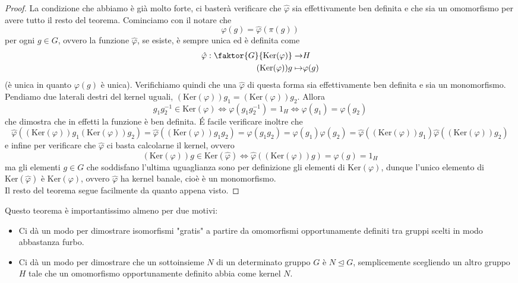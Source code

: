 \documentclass[11pt]{scrartcl}
\renewcommand{\ker}[1]{\text{Ker}\!\left(#1\right)}
\newcommand{\normal}{\mathrel{\unlhd}}
\begin{document}
	\begin{proof}
		La condizione che abbiamo è già molto forte, ci basterà verificare che $\hat{\varphi}$ sia effettivamente ben definita e che sia un omomorfismo per avere tutto il resto del teorema. Cominciamo con il notare che 
		$$\varphi(g)=\hat{\varphi}(\pi(g))$$
		per ogni $g\in G$, ovvero la funzione $\hat{\varphi}$, se esiste, è sempre unica ed è definita come
		\begin{align*}
			\hat{\varphi}:\faktor{G}{\ker{\varphi}}\to & H \\
			(\ker{\varphi})g \mapsto & \varphi(g)
		\end{align*}
		(è unica in quanto $\varphi(g)$ è unica). Verifichiamo quindi che una $\hat{\varphi}$ di questa forma sia effettivamente ben definita e sia un monomorfismo. \\
		Pendiamo due laterali destri del kernel uguali, $(\ker {\varphi})g_1=(\ker{\varphi})g_2$. Allora 
		$$g_1g_2^{-1}\in\ker{\varphi} \iff \varphi(g_1g_2^{-1})=1_H \iff \varphi(g_1)=\varphi(g_2)$$
		che dimostra che in effetti la funzione è ben definita. \'E facile verificare inoltre che
		$$\hat{\varphi}\left((\ker{\varphi})g_1(\ker {\varphi})g_2\right)=\hat{\varphi}\left(\left(\ker {\varphi}\right)g_1g_2\right)=\varphi(g_1g_2)=\varphi(g_1)\varphi(g_2)=\hat{\varphi}((\ker{\varphi})g_1)\hat{\varphi}((\ker{\varphi})g_2)$$
		e infine per verificare che $\hat{\varphi}$ ci basta calcolarne il kernel, ovvero
		$$(\ker{\varphi}) g\in \ker{\hat{\varphi}} \iff \hat{\varphi}((\ker{\varphi}) g)=\varphi(g)=1_H$$
		ma gli elementi $g\in G$ che soddisfano l'ultima uguaglianza sono per definizione gli elementi di $\ker{\varphi}$, dunque l'unico elemento di $\ker{\hat{\varphi}}$ è $\ker{\varphi}$, ovvero $\hat{\varphi}$ ha kernel banale, cioè è un monomorfismo. \\
		Il resto del teorema segue facilmente da quanto appena visto.
	\end{proof}
	\begin{remark}
		Questo teorema è importantissimo almeno per due motivi:
		\begin{itemize}
			\item Ci dà un modo per dimostrare isomorfismi "gratis" a partire da omomorfismi opportunamente definiti tra gruppi scelti in modo abbastanza furbo.
			\item Ci dà un modo per dimostrare che un sottoinsieme $N$ di un determinato gruppo $G$ è $N\normal G$, semplicemente scegliendo un altro gruppo $H$ tale che un omomorfismo opportunamente definito abbia come kernel $N$.
		\end{itemize}
	\end{remark}
\end{document}
